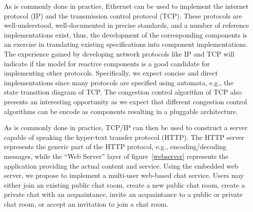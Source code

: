 As is commonly done in practice, Ethernet can be used to implement the internet protocol (IP) and the transmission control protocol (TCP).
These protocols are well-understood, well-documented in precise standards, and a number of reference implementations exist, thus, the development of the corresponding components is an exercise in translating existing specifications into component implementations.
The experience gained by developing network protocols like IP and TCP will indicate if the model for reactive components is a good candidate for implementing other protocols.
Specifically, we expect concise and direct implementations since many protocols are specified using automata, e.g., the state transition diagram of TCP.
The congestion control algorithm of TCP also presents an interesting opportunity as we expect that different congestion control algorithms can be encode as components resulting in a pluggable architecture.

As is commonly done in practice, TCP/IP can then be used to construct a server capable of speaking the hyper-text transfer protocol (HTTP).
The HTTP server represents the generic part of the HTTP protocol, e.g., encoding/decoding messages, while the ``Web Server'' layer of figure~\ref{webserver} represents the application providing the actual content and service.
Using the embedded web server, we propose to implement a multi-user web-based chat service.
Users may either join an existing public chat room, create a new public chat room, create a private chat with an acquaintance, invite an acquaintance to a public or private chat room, or accept an invitation to join a chat room.

